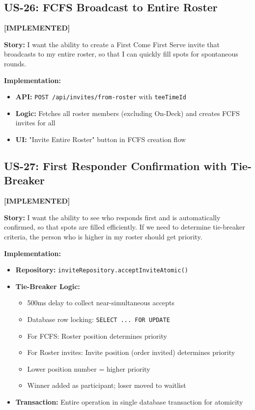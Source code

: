 \documentclass[11pt,a4paper]{article}
\newcommand{\implemented}{\textcolor{implemented}{\textbf{[IMPLEMENTED]}}}
\begin{document}
\subsection{US-26: FCFS Broadcast to Entire Roster}
\implemented

\textbf{Story:} I want the ability to create a First Come First Serve invite that broadcasts to my entire roster, so that I can quickly fill spots for spontaneous rounds.

\textbf{Implementation:}
\begin{itemize}[leftmargin=*]
  \item \textbf{API:} \texttt{POST /api/invites/from-roster} with \texttt{teeTimeId}
  \item \textbf{Logic:} Fetches all roster members (excluding On-Deck) and creates FCFS invites for all
  \item \textbf{UI:} "Invite Entire Roster" button in FCFS creation flow
\end{itemize}

\subsection{US-27: First Responder Confirmation with Tie-Breaker}
\implemented

\textbf{Story:} I want the ability to see who responds first and is automatically confirmed, so that spots are filled efficiently. If we need to determine tie-breaker criteria, the person who is higher in my roster should get priority.

\textbf{Implementation:}
\begin{itemize}[leftmargin=*]
  \item \textbf{Repository:} \texttt{inviteRepository.acceptInviteAtomic()}
  \item \textbf{Tie-Breaker Logic:}
    \begin{itemize}
      \item 500ms delay to collect near-simultaneous accepts
      \item Database row locking: \texttt{SELECT ... FOR UPDATE}
      \item For FCFS: Roster position determines priority
      \item For Roster invites: Invite position (order invited) determines priority
      \item Lower position number = higher priority
      \item Winner added as participant; loser moved to waitlist
    \end{itemize}
  \item \textbf{Transaction:} Entire operation in single database transaction for atomicity
\end{itemize}
\end{document}
